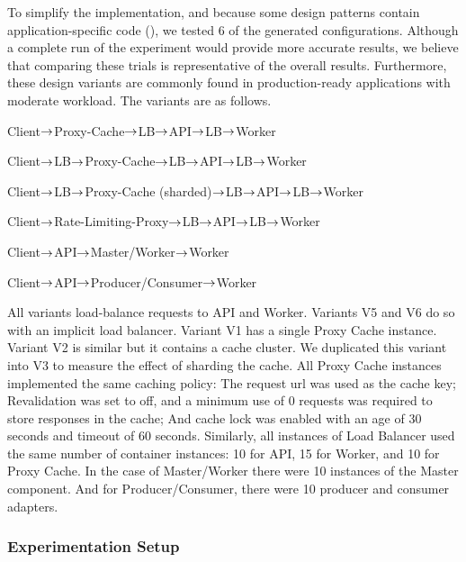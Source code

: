 To simplify the implementation, and because some design patterns contain application-specific code (), we tested 6 of the generated configurations. Although a complete run of the experiment would provide more accurate results, we believe that comparing these trials is representative of the overall results. Furthermore, these design variants are commonly found in production-ready applications with moderate workload. The variants are as follows.

\begin{description}[noitemsep,font=\bfseries\normalsize]
	\item[V1] Client$\rightarrow$Proxy-Cache$\rightarrow$LB$\rightarrow$API$\rightarrow$LB$\rightarrow$Worker
	\item[V2] Client$\rightarrow$LB$\rightarrow$Proxy-Cache$\rightarrow$LB$\rightarrow$API$\rightarrow$LB$\rightarrow$Worker
	\item[V3] Client$\rightarrow$LB$\rightarrow$Proxy-Cache (sharded)$\rightarrow$LB$\rightarrow$API$\rightarrow$LB$\rightarrow$Worker
	\item[V4] Client$\rightarrow$Rate-Limiting-Proxy$\rightarrow$LB$\rightarrow$API$\rightarrow$LB$\rightarrow$Worker
	\item[V5] Client$\rightarrow$API$\rightarrow$Master/Worker$\rightarrow$Worker
	\item[V6] Client$\rightarrow$API$\rightarrow$Producer/Consumer$\rightarrow$Worker
\end{description}

All variants load-balance requests to API and Worker. Variants V5 and V6 do so with an implicit load balancer. Variant V1 has a single Proxy Cache instance. Variant V2 is similar but it contains a cache cluster. We duplicated this variant into V3 to measure the effect of sharding the cache. All Proxy Cache instances implemented the same caching policy: The request \acrshort{url} was used as the cache key; Revalidation was set to off, and a minimum use of 0 requests was required to store responses in the cache; And cache lock was enabled with an age of 30 seconds and timeout of 60 seconds. Similarly, all instances of Load Balancer used the same number of container instances: 10 for API, 15 for Worker, and 10 for Proxy Cache. In the case of Master/Worker there were 10 instances of the Master component. And for Producer/Consumer, there were 10 producer and consumer adapters.

\subsubsection{Experimentation Setup}
\label{par:evaluation--im-architecture-experimental-setup}

